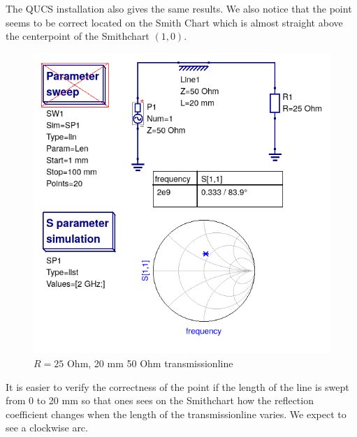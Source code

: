 \documentclass{article}
\begin{document}
\begin{multicols}{2}
\begin{enumerate}[label=(\alph*)]
The QUCS installation also gives the same
results. We also notice that the point seems to be correct
located on the Smith Chart which is almost straight
above the centerpoint of the Smithchart $(1,0)$.
\begin{figure}[H]
  \includegraphics[width=\linewidth]{tline1.png}
  \caption{$R=25$ Ohm, 20 mm 50 Ohm transmissionline}
  \label{fig4}
\end{figure}
It is easier to verify the correctness of the point if
the length of the line is swept from 0 to 20 mm so that ones
sees on the Smithchart how the reflection coefficient changes when
the length of the transmissionline varies.
We expect to see a clockwise arc.
\begin{figure}[H]

\end{figure}
\end{enumerate}
\end{multicols}
\end{document}
